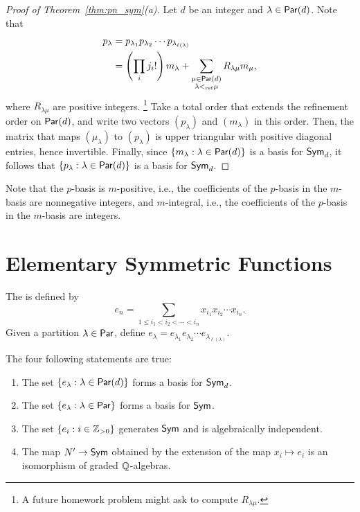 \begin{proof}[Proof of Theorem~\ref{thm:pn_sym}(a)]
    Let \(d\) be an integer and \(\lambda \in \operatorname{\mathsf{Par}}(d)\).
    Note that
    \begin{align*}
        p_\lambda
         & = p_{\lambda_1}p_{\lambda_2}\cdots p_{\lambda_{\ell(\lambda)}}            \\
         & = \left( \prod_i j_i! \right) m_\lambda + \sum_{\substack{\mu \in \operatorname{\mathsf{Par}}(d) \\ \lambda <_{\mathrm{ref}} \mu}} R_{\lambda\mu}m_\mu,
    \end{align*}
    where \(R_{\lambda\mu}\) are positive integers.%
    \footnote{A future homework problem might ask to compute \(R_{\lambda\mu}\).}
    Take a total order that extends the refinement order on \(\operatorname{\mathsf{Par}}(d)\), and write two vectors \((p_\lambda)\) and \((m_\lambda)\) in this order.
    Then, the matrix that maps \((\mu_\lambda)\) to \((p_\lambda)\) is upper triangular with positive diagonal entries, hence invertible.
    Finally, since \(\{m_\lambda : \lambda \in \operatorname{\mathsf{Par}}(d)\}\) is a basis for \(\operatorname{\mathsf{Sym}}_d\), it follows that \(\{p_\lambda : \lambda \in \operatorname{\mathsf{Par}}(d)\}\) is a basis for \(\operatorname{\mathsf{Sym}}_d\).
\end{proof}

Note that the \(p\)-basis is \(m\)-positive, i.e., the coefficients of the \(p\)-basis in the \(m\)-basis are nonnegative integers,
and \(m\)-integral, i.e., the coefficients of the \(p\)-basis in the \(m\)-basis are integers.

\section{Elementary Symmetric Functions}

The  is defined by
\begin{equation}
    e_n = \sum_{1 \leq i_1 < i_2 < \cdots < i_n} x_{i_1}x_{i_2}\cdots x_{i_n}.
\end{equation}
Given a partition \(\lambda \in \operatorname{\mathsf{Par}}\), define \(e_\lambda = e_{\lambda_1}e_{\lambda_2}\cdots e_{\lambda_{\ell(\lambda)}}\).

\begin{theorem} \label{thm:en_sym}
    The four following statements are true:
    \begin{enumerate}
        \item \label{item:el_symd_basis}
              The set \(\{e_\lambda : \lambda \in \operatorname{\mathsf{Par}}(d)\}\) forms a basis for \(\operatorname{\mathsf{Sym}}_d\).
        \item \label{item:el_sym_basis}
              The set \(\{e_\lambda : \lambda \in \operatorname{\mathsf{Par}}\}\) forms a basis for \(\operatorname{\mathsf{Sym}}\).
        \item \label{item:en_sym_generates}
              The set \(\{e_i : i \in \mathbb{Z}_{> 0}\}\) generates \(\operatorname{\mathsf{Sym}}\) and is algebraically independent.
        \item \label{item:en_sym_graded_isom}
              The map \(N' \to \operatorname{\mathsf{Sym}}\) obtained by the extension of the map \(x_i \mapsto e_i\) is an isomorphism of graded \(\mathbb{Q}\)-algebras.
    \end{enumerate}
\end{theorem}

